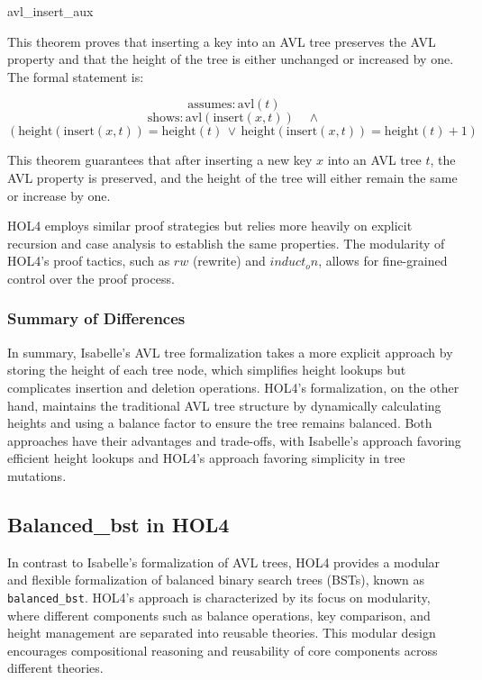 \begin{thm}{avl\_insert\_aux}
	
	This theorem proves that inserting a key into an AVL tree preserves the AVL property and that the height of the tree is either unchanged or increased by one. The formal statement is:
	
	\[
	\text{assumes:} \, \text{avl}(t)
	\]
	\[
	\text{shows:} \, \text{avl}(\text{insert}(x, t)) \quad \land
	\]
	\[
	\left( \text{height}(\text{insert}(x, t)) = \text{height}(t) \, \lor \, 
	\text{height}(\text{insert}(x, t)) = \text{height}(t) + 1 \right)
	\]
	
	This theorem guarantees that after inserting a new key \( x \) into an AVL tree \( t \), the AVL property is preserved, and the height of the tree will either remain the same or increase by one.
	
\end{thm}
HOL4 employs similar proof strategies but relies more heavily on explicit recursion and case analysis to establish the same properties. The modularity of HOL4’s proof tactics, such as \(rw\) (rewrite) and \(induct_on\), allows for fine-grained control over the proof process.

\subsubsection{Summary of Differences}
In summary, Isabelle’s AVL tree formalization takes a more explicit approach by storing the height of each tree node, which simplifies height lookups but complicates insertion and deletion operations. HOL4’s formalization, on the other hand, maintains the traditional AVL tree structure by dynamically calculating heights and using a balance factor to ensure the tree remains balanced. Both approaches have their advantages and trade-offs, with Isabelle’s approach favoring efficient height lookups and HOL4’s approach favoring simplicity in tree mutations.

\subsection{Balanced\_bst in HOL4}

In contrast to Isabelle’s formalization of AVL trees, HOL4 \cite{HOLBalancedBST} provides a modular and flexible formalization of balanced binary search trees (BSTs), known as \texttt{balanced\_bst}. HOL4's approach is characterized by its focus on modularity, where different components such as balance operations, key comparison, and height management are separated into reusable theories. This modular design encourages compositional reasoning and reusability of core components across different theories.

